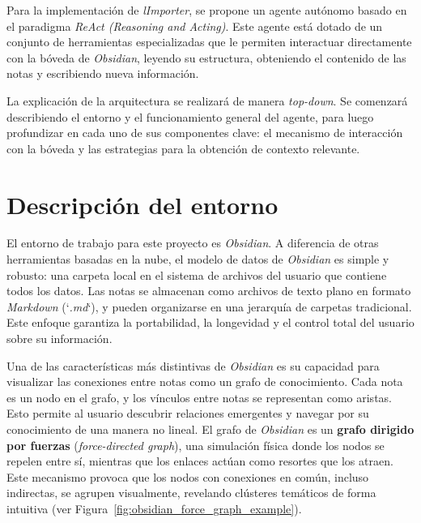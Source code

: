 Para la implementación de \textit{lImporter}, se propone un agente autónomo basado en el paradigma \textit{ReAct (Reasoning and Acting)}. Este agente está dotado de un conjunto de herramientas especializadas que le permiten interactuar directamente con la bóveda de \textit{Obsidian}, leyendo su estructura, obteniendo el contenido de las notas y escribiendo nueva información.

La explicación de la arquitectura se realizará de manera \textit{top-down}. Se comenzará describiendo el entorno y el funcionamiento general del agente, para luego profundizar en cada uno de sus componentes clave: el mecanismo de interacción con la bóveda y las estrategias para la obtención de contexto relevante.

\section{Descripción del entorno}
El entorno de trabajo para este proyecto es \textit{Obsidian}. A diferencia de otras herramientas basadas en la nube, el modelo de datos de \textit{Obsidian} es simple y robusto: una carpeta local en el sistema de archivos del usuario que contiene todos los datos. Las notas se almacenan como archivos de texto plano en formato \textit{Markdown} (`\textit{.md}`), y pueden organizarse en una jerarquía de carpetas tradicional. Este enfoque garantiza la portabilidad, la longevidad y el control total del usuario sobre su información.

Una de las características más distintivas de \textit{Obsidian} es su capacidad para visualizar las conexiones entre notas como un grafo de conocimiento. Cada nota es un nodo en el grafo, y los vínculos entre notas se representan como aristas. Esto permite al usuario descubrir relaciones emergentes y navegar por su conocimiento de una manera no lineal. El grafo de \textit{Obsidian} es un \textbf{grafo dirigido por fuerzas} (\textit{force-directed graph}), una simulación física donde los nodos se repelen entre sí, mientras que los enlaces actúan como resortes que los atraen. Este mecanismo provoca que los nodos con conexiones en común, incluso indirectas, se agrupen visualmente, revelando clústeres temáticos de forma intuitiva (ver Figura~\ref{fig:obsidian_force_graph_example}).

